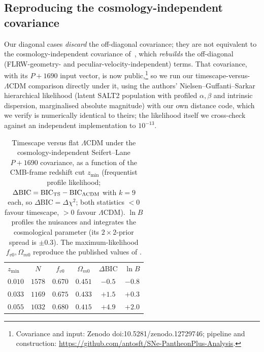\documentclass[aps,prd,twocolumn,nofootinbib,superscriptaddress,floatfix]{revtex4-2}
\newcommand{\fvo}{f_{v0}}
\newcommand{\Lcdm}{\Lambda\mathrm{CDM}}
\newcommand{\dBIC}{\Delta\mathrm{BIC}}
\begin{document}
\subsection{Reproducing the cosmology-independent covariance}
\label{sec:seifert}
Our diagonal cases \emph{discard} the off-diagonal covariance; they are not
equivalent to the cosmology-independent covariance of~\cite{Lane2025,Seifert2024},
which \emph{rebuilds} the off-diagonal (FLRW-geometry- and
peculiar-velocity-independent) terms. That covariance, with its $P{+}1690$ input
vector, is now public,\footnote{Covariance and input: Zenodo
doi:10.5281/zenodo.12729746; pipeline and construction:
\url{https://github.com/antosft/SNe-PantheonPlus-Analysis}.} so we run our
timescape-versus-$\Lcdm$ comparison directly under it, using the authors'
Nielsen--Guffanti--Sarkar hierarchical likelihood (latent SALT2 population with
profiled $\alpha,\beta$ and intrinsic dispersion, marginalised absolute
magnitude) with our own distance code, which we verify is numerically identical
to theirs; the likelihood itself we cross-check against an independent
implementation to $10^{-13}$.

\begin{table}[t]
\caption{Timescape versus flat $\Lcdm$ under the cosmology-independent
Seifert--Lane $P{+}1690$ covariance, as a function of the CMB-frame redshift cut
$z_{\min}$ (frequentist profile likelihood; $\dBIC=\mathrm{BIC}_{\rm TS}-
\mathrm{BIC}_{\Lcdm}$ with $k=9$ each, so $\dBIC=\Delta\chi^2$; both statistics
$<0$ favour timescape, $>0$ favour $\Lcdm$). $\ln B$ profiles the nuisances and
integrates the cosmological parameter (its $2\times2$-prior spread is $\pm0.3$).
The maximum-likelihood $\fvo,\Omega_{m0}$ reproduce the published values of
\cite{Lane2025}.}
\label{tab:seifert}
\begin{ruledtabular}
\begin{tabular}{lccccc}
$z_{\min}$ & $N$ & $\fvo$ & $\Omega_{m0}$ & $\dBIC$ & $\ln B$ \\
\colrule
$0.010$ & $1578$ & $0.670$ & $0.451$ & $-0.5$ & $-0.8$ \\
$0.033$ & $1169$ & $0.675$ & $0.433$ & $+1.5$ & $+0.3$ \\
$0.055$ & $1032$ & $0.680$ & $0.415$ & $+4.9$ & $+2.0$ \\
\end{tabular}
\end{ruledtabular}
\end{table}
\end{document}
